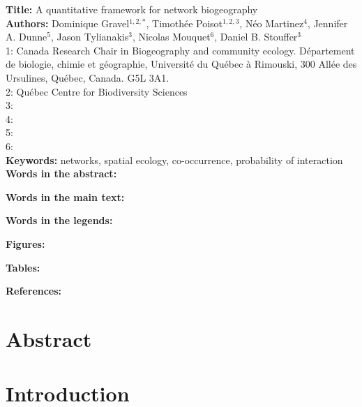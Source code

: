 \documentclass[12pt]{article}
\begin{document}
\linenumbers 
\modulolinenumbers[1]

\textbf{Title:} A quantitative framework for network biogeography\\

\textbf{Authors:} Dominique Gravel$^{1,2,*}$, Timoth\'ee Poisot$^{1,2,3}$, N\'eo
Martinez$^{4}$, Jennifer A. Dunne$^{5}$, Jason Tylianakis$^{3}$, Nicolas
Mouquet$^{6}$, Daniel B. Stouffer$^{3}$ \\

1: Canada Research Chair in Biogeography and community ecology. D\'epartement de
biologie, chimie et g\'eographie, Universit\'e du Qu\'ebec \`a Rimouski, 300
All\'ee des Ursulines, Qu\'ebec, Canada. G5L 3A1.\\

2: Qu\'ebec Centre for Biodiversity Sciences\\

3: \\

4: \\

5: \\

6:\\

\textbf{Keywords:} networks, spatial ecology, co-occurrence, probability of interaction\\

\textbf{Words in the abstract:}  

\textbf{Words in the main text:}  

\textbf{Words in the legends:}   

\textbf{Figures:} 

\textbf{Tables:}         

\textbf{References:} 

\newpage
\doublespacing

\section*{Abstract} 

\newpage
\section*{Introduction}
\end{document}
